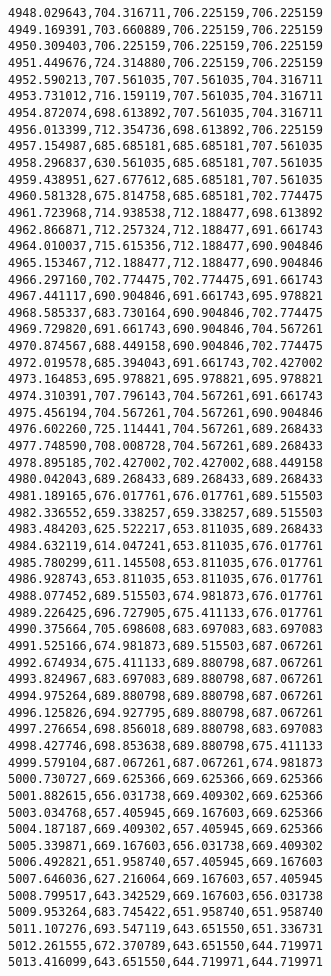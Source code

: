 \documentclass[11pt]{article}
\begin{document}
\begin{Verbatim}[commandchars=\\\{\}]
4948.029643,704.316711,706.225159,706.225159
4949.169391,703.660889,706.225159,706.225159
4950.309403,706.225159,706.225159,706.225159
4951.449676,724.314880,706.225159,706.225159
4952.590213,707.561035,707.561035,704.316711
4953.731012,716.159119,707.561035,704.316711
4954.872074,698.613892,707.561035,704.316711
4956.013399,712.354736,698.613892,706.225159
4957.154987,685.685181,685.685181,707.561035
4958.296837,630.561035,685.685181,707.561035
4959.438951,627.677612,685.685181,707.561035
4960.581328,675.814758,685.685181,702.774475
4961.723968,714.938538,712.188477,698.613892
4962.866871,712.257324,712.188477,691.661743
4964.010037,715.615356,712.188477,690.904846
4965.153467,712.188477,712.188477,690.904846
4966.297160,702.774475,702.774475,691.661743
4967.441117,690.904846,691.661743,695.978821
4968.585337,683.730164,690.904846,702.774475
4969.729820,691.661743,690.904846,704.567261
4970.874567,688.449158,690.904846,702.774475
4972.019578,685.394043,691.661743,702.427002
4973.164853,695.978821,695.978821,695.978821
4974.310391,707.796143,704.567261,691.661743
4975.456194,704.567261,704.567261,690.904846
4976.602260,725.114441,704.567261,689.268433
4977.748590,708.008728,704.567261,689.268433
4978.895185,702.427002,702.427002,688.449158
4980.042043,689.268433,689.268433,689.268433
4981.189165,676.017761,676.017761,689.515503
4982.336552,659.338257,659.338257,689.515503
4983.484203,625.522217,653.811035,689.268433
4984.632119,614.047241,653.811035,676.017761
4985.780299,611.145508,653.811035,676.017761
4986.928743,653.811035,653.811035,676.017761
4988.077452,689.515503,674.981873,676.017761
4989.226425,696.727905,675.411133,676.017761
4990.375664,705.698608,683.697083,683.697083
4991.525166,674.981873,689.515503,687.067261
4992.674934,675.411133,689.880798,687.067261
4993.824967,683.697083,689.880798,687.067261
4994.975264,689.880798,689.880798,687.067261
4996.125826,694.927795,689.880798,687.067261
4997.276654,698.856018,689.880798,683.697083
4998.427746,698.853638,689.880798,675.411133
4999.579104,687.067261,687.067261,674.981873
5000.730727,669.625366,669.625366,669.625366
5001.882615,656.031738,669.409302,669.625366
5003.034768,657.405945,669.167603,669.625366
5004.187187,669.409302,657.405945,669.625366
5005.339871,669.167603,656.031738,669.409302
5006.492821,651.958740,657.405945,669.167603
5007.646036,627.216064,669.167603,657.405945
5008.799517,643.342529,669.167603,656.031738
5009.953264,683.745422,651.958740,651.958740
5011.107276,693.547119,643.651550,651.336731
5012.261555,672.370789,643.651550,644.719971
5013.416099,643.651550,644.719971,644.719971

\end{Verbatim}
\end{document}
